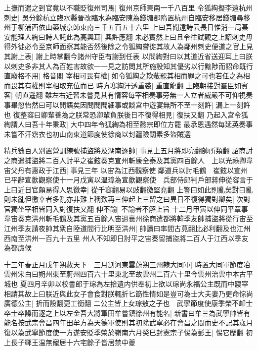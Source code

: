 上撫而遣之到官竟以不職貶復州司馬|{
	復州京師東南一千八百里}
令狐綯擬李遠杭州刺史|{
	吳分餘杭立臨水縣晉改臨水為臨安陳為錢塘郡隋置杭州自臨安移居錢塘尋移州于柳浦西依山築城京師東南三千五百五十六里}
上曰吾聞遠詩云長日惟消一局棊安能理人綯曰詩人託此為高興耳|{
	興許應翻}
未必實然上曰且令往試觀之上詔刺史毋得外徙必令至京師面察其能否然後除之令狐綯嘗徙其故人為鄰州刺史便道之官上見其謝上表|{
	謝上時掌翻今諸州守臣有謝到任表}
以問綯對曰以其道近省送迎耳上曰朕以刺史多非其人為百姓害故欲一一見之訪問其所施設知其優劣以行黜陟而詔命既行直廢格不用|{
	格音閣}
宰相可畏有權|{
	如令狐綯之欺蔽罷其相而罪之可也若任之為相而畏其有權則宰相取充位而已}
時方寒綯汗透重裘|{
	重直龍翻}
上臨朝接對羣臣如賓客|{
	朝直遥翻}
雖左右近習未嘗見其有惰容每宰相奏事旁無一人立者威嚴不可仰視奏事畢忽怡然曰可以閒語矣因問閭閻細事或談宫中遊宴無所不至一刻許|{
	漏上一刻許也}
復整容曰卿輩善為之朕常恐卿輩負朕後日不復得相見|{
	復扶又翻}
乃起入宫令狐綯謂人曰吾十年秉政|{
	大中四年令狐綯為相至懿宗即位方罷}
最承恩遇然每延英奏事未嘗不汗霑衣也初山南東道節度使徐商以封疆險闊素多盜賊選

精兵數百人别置營訓練號捕盜將及湖南逐帥|{
	事見上五月將即亮翻帥所類翻}
詔商討之商遣捕盜將二百人討平之崔鉉奏克宣州斬康全泰及其黨四百餘人　上以光祿卿韋宙父丹有惠政于江西|{
	事見三年}
以宙為江西觀察使鄰道兵以討毛鶴　崔鉉以宣州已平辭宣歙觀察使十一月戊寅以温璋為宣歙觀察使　兵部侍郎判戶部蔣伸從容言于上曰近日官頗易得人思徼幸|{
	從千容翻易以䜴翻徼堅堯翻}
上警曰如此則亂矣對曰亂則未亂但徼幸者多亂亦非難上稱歎再三伸起上三留之曰異日不復得獨對卿矣|{
	次對官獨坐宰相皆同入對復扶又翻}
伸不諭|{
	不諭者不解上旨}
十二月甲寅以伸同平章事　韋宙奏克洪州斬毛鶴及其黨五百餘人宙過襄州徐商遣都將韓季友帥捕盜將從行宙至江州季友請夜帥其衆自陸道間行比明至洪州|{
	帥讀曰率間古莧翻比必利翻及也江州西南至洪州一百九十五里}
州人不知即日討平之宙奏留捕盜將二百人于江西以季友為都虞候

十三年春正月戊午朔赦天下　三月割河東雲蔚朔三州隸大同軍|{
	時置大同軍節度冶雲州宋白曰朔州東至蔚州四百六十里東北至故雲州二百六十里今雲州治雲中本古平城也}
夏四月辛卯以校書郎于琮為左拾遺内供奉初上欲以琮尚永福公主既而中寢宰相請其故上曰朕近與此女子會食對朕輒折匕筯性情如是豈可為士大夫妻乃更命悰尚廣德公主|{
	折而設翻更工衡翻}
二公主皆上女琮敖之子也　武寧節度使康季榮不卹士卒士卒譟而逐之上以左金吾大將軍田牟嘗鎮徐州有能名|{
	新書曰牟三為武寧帥皆有能名按武宗會昌四年田牟方為天德軍使則其初除武寧必在會昌之間而史不記其歲月}
復以為武寧節度使一方遂安貶季榮於嶺南六月癸巳封憲宗子惕為彭王|{
	惕它歷翻}
初上長子鄆王温無寵居十六宅餘子皆居禁中夔

